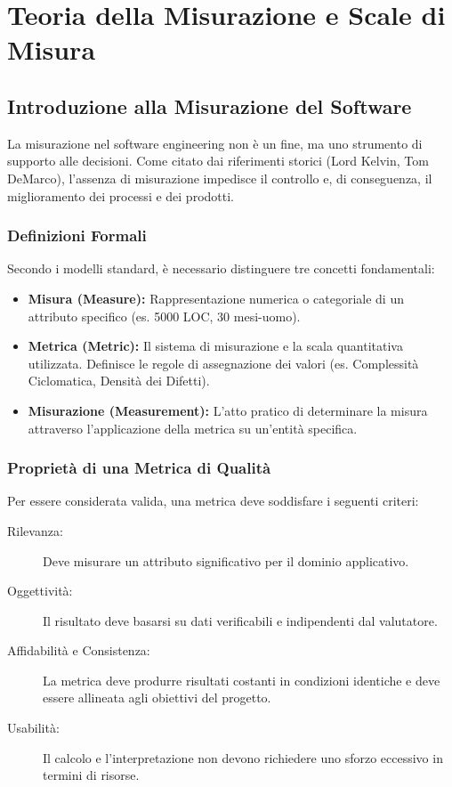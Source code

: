 \chapter{Teoria della Misurazione e Scale di Misura}

\section{Introduzione alla Misurazione del Software}
La misurazione nel software engineering non è un fine, ma uno strumento di supporto alle decisioni. Come citato dai riferimenti storici (Lord Kelvin, Tom DeMarco), l'assenza di misurazione impedisce il controllo e, di conseguenza, il miglioramento dei processi e dei prodotti.

\subsection{Definizioni Formali}
Secondo i modelli standard, è necessario distinguere tre concetti fondamentali:
\begin{itemize}[label=\textbullet]
    \item \textbf{Misura (Measure):} Rappresentazione numerica o categoriale di un attributo specifico (es. 5000 LOC, 30 mesi-uomo).
    \item \textbf{Metrica (Metric):} Il sistema di misurazione e la scala quantitativa utilizzata. Definisce le regole di assegnazione dei valori (es. Complessità Ciclomatica, Densità dei Difetti).
    \item \textbf{Misurazione (Measurement):} L'atto pratico di determinare la misura attraverso l'applicazione della metrica su un'entità specifica.
\end{itemize}

\subsection{Proprietà di una Metrica di Qualità}
Per essere considerata valida, una metrica deve soddisfare i seguenti criteri:
\begin{description}
    \item[Rilevanza:] Deve misurare un attributo significativo per il dominio applicativo.
    \item[Oggettività:] Il risultato deve basarsi su dati verificabili e indipendenti dal valutatore.
    \item[Affidabilità e Consistenza:] La metrica deve produrre risultati costanti in condizioni identiche e deve essere allineata agli obiettivi del progetto.
    \item[Usabilità:] Il calcolo e l'interpretazione non devono richiedere uno sforzo eccessivo in termini di risorse.
\end{description}

